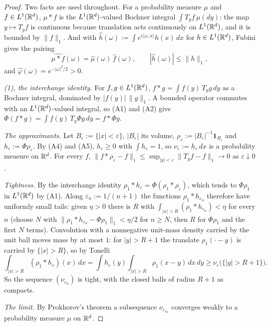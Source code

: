\begin{proof}
Two facts are used throughout. For a probability measure $\mu$ and $f \in L^1(\mathbb{R}^d)$, $\mu * f$
is the $L^1(\mathbb{R}^d)$-valued Bochner integral $\int T_yf\,\mu(dy)$: the map $y \mapsto T_yf$ is
continuous because translation acts continuously on $L^1(\mathbb{R}^d)$, and it is bounded by
$\|f\|_1$. And with $\widehat h(\omega) := \int e^{i\langle\omega,x\rangle}h(x)\,dx$ for
$h \in L^1(\mathbb{R}^d)$, Fubini gives the pairing
\[
  \widehat{\mu * f}(\omega) = \widehat\mu(\omega)\,\widehat f(\omega),
  \qquad |\widehat h(\omega)| \le \|h\|_1 ,
\]
and $\widehat\varphi(\omega) = e^{-|\omega|^2/2} > 0$.

\emph{(1), the interchange identity.} For $f, g \in L^1(\mathbb{R}^d)$, $f * g = \int f(y)\,T_yg\,dy$ as
a Bochner integral, dominated by $|f(y)|\,\|g\|_1$. A bounded operator commutes with an
$L^1(\mathbb{R}^d)$-valued integral, so (A1) and (A2) give $\Phi(f * g) = \int f(y)\,T_y\Phi g\,dy
= f * \Phi g$.

\emph{The approximants.} Let $B_\varepsilon := \{|x| < \varepsilon\}$, $|B_\varepsilon|$ its
volume, $\rho_\varepsilon := |B_\varepsilon|^{-1}\mathbf 1_{B_\varepsilon}$ and
$h_\varepsilon := \Phi\rho_\varepsilon$. By (A4) and (A5), $h_\varepsilon \ge 0$ with
$\int h_\varepsilon = 1$, so $\nu_\varepsilon := h_\varepsilon\,dx$ is a probability measure on
$\mathbb{R}^d$. For every $f$, $\|f * \rho_\varepsilon - f\|_1 \le \sup_{|y| < \varepsilon}
\|T_yf - f\|_1 \to 0$ as $\varepsilon \downarrow 0$.

\emph{Tightness.} By the interchange identity $\rho_1 * h_\varepsilon = \Phi(\rho_1 *
\rho_\varepsilon)$, which tends to $\Phi\rho_1$ in $L^1(\mathbb{R}^d)$ by (A1). Along
$\varepsilon_n := 1/(n+1)$ the functions $\rho_1 * h_{\varepsilon_n}$ therefore have uniformly
small tails: given $\eta > 0$ there is $R$ with $\int_{|x| > R}(\rho_1 * h_{\varepsilon_n}) < \eta$
for every $n$ (choose $N$ with $\|\rho_1 * h_{\varepsilon_n} - \Phi\rho_1\|_1 < \eta/2$ for
$n \ge N$, then $R$ for $\Phi\rho_1$ and the first $N$ terms). Convolution with a nonnegative
unit-mass density carried by the unit ball moves mass by at most $1$: for $|y| > R + 1$ the
translate $\rho_1(\cdot - y)$ is carried by $\{|x| > R\}$, so by Tonelli
\[
  \int_{|x| > R}(\rho_1 * h_\varepsilon)(x)\,dx
  = \int h_\varepsilon(y)\int_{|x| > R}\rho_1(x - y)\,dx\,dy
  \ge \nu_\varepsilon\bigl(\{|y| > R + 1\}\bigr) .
\]
So the sequence $(\nu_{\varepsilon_n})$ is tight, with the closed balls of radius $R + 1$ as
compacts.

\emph{The limit.} By Prokhorov's theorem a subsequence $\nu_{\varepsilon_{n_k}}$ converges weakly
to a probability measure $\mu$ on $\mathbb{R}^d$.


\end{proof}
